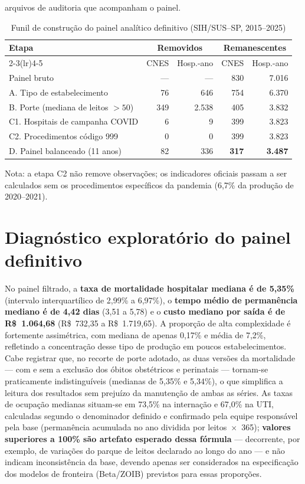 arquivos de auditoria que acompanham o painel.

\begin{table}[htbp]
\centering
\caption{Funil de construção do painel analítico definitivo (SIH/SUS--SP, 2015--2025)}
\label{tab:funil}
\begin{tabular}{lrrrr}
\toprule
Etapa & \multicolumn{2}{c}{Removidos} & \multicolumn{2}{c}{Remanescentes} \\
\cmidrule(lr){2-3}\cmidrule(lr){4-5}
 & CNES & Hosp.-ano & CNES & Hosp.-ano \\
\midrule
Painel bruto & --- & --- & 830 & 7.016 \\
A. Tipo de estabelecimento & 76 & 646 & 754 & 6.370 \\
B. Porte (mediana de leitos $>50$) & 349 & 2.538 & 405 & 3.832 \\
C1. Hospitais de campanha COVID & 6 & 9 & 399 & 3.823 \\
C2. Procedimentos código 999 & 0 & 0 & 399 & 3.823 \\
D. Painel balanceado (11 anos) & 82 & 336 & \textbf{317} & \textbf{3.487} \\
\bottomrule
\end{tabular}

\smallskip
{\footnotesize Nota: a etapa C2 não remove observações; os indicadores oficiais passam a ser calculados sem os procedimentos específicos da pandemia (6,7\% da produção de 2020--2021).}
\end{table}

\section*{Diagnóstico exploratório do painel definitivo}

No painel filtrado, a \textbf{taxa de mortalidade hospitalar mediana é de 5,35\%} (intervalo interquartílico de 2,99\% a 6,97\%), o \textbf{tempo médio de permanência mediano é de 4,42 dias} (3,51 a 5,78) e o \textbf{custo mediano por saída é de R\$~1.064,68} (R\$~732,35 a R\$~1.719,65). A proporção de alta complexidade é fortemente assimétrica, com mediana de apenas 0,17\% e média de 7,2\%, refletindo a concentração desse tipo de produção em poucos estabelecimentos. Cabe registrar que, no recorte de porte adotado, as duas versões da mortalidade --- com e sem a exclusão dos óbitos obstétricos e perinatais --- tornam-se praticamente indistinguíveis (medianas de 5,35\% e 5,34\%), o que simplifica a leitura dos resultados sem prejuízo da manutenção de ambas as séries. As taxas de ocupação medianas situam-se em 73,5\% na internação e 67,0\% na UTI, calculadas segundo o denominador definido e confirmado pela equipe responsável pela base (permanência acumulada no ano dividida por leitos~$\times$~365); \textbf{valores superiores a 100\% são artefato esperado dessa fórmula} --- decorrente, por exemplo, de variações do parque de leitos declarado ao longo do ano --- e não indicam inconsistência da base, devendo apenas ser considerados na especificação dos modelos de fronteira (Beta/ZOIB) previstos para essas proporções.

